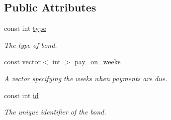\subsection*{Public Attributes}
\begin{DoxyCompactItemize}
\item 
const int \mbox{\hyperlink{classBond_a48da24878beedd71cbaa990cea860667}{type}}
\begin{DoxyCompactList}\small\item\em The type of bond. \end{DoxyCompactList}\item 
const vector$<$ int $>$ \mbox{\hyperlink{classBond_ae8dd46fcbf95c993460ffe4ea1f52739}{pay\+\_\+on\+\_\+weeks}}
\begin{DoxyCompactList}\small\item\em A vector specifying the weeks when payments are due. \end{DoxyCompactList}\item 
const int \mbox{\hyperlink{classBond_a7f75bcafbc16676ad6dbafbf40afae4a}{id}}
\begin{DoxyCompactList}\small\item\em The unique identifier of the bond. \end{DoxyCompactList}\end{DoxyCompactItemize}
